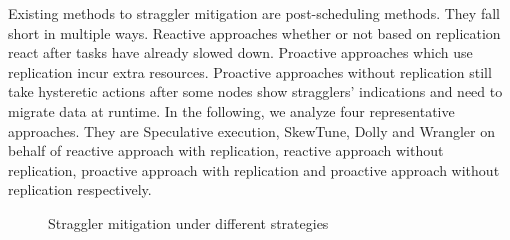 \documentclass[10pt,conference,compsocconf,letterpaper]{IEEEtran}
\begin{document}
  Existing methods to straggler mitigation are post-scheduling methods. They fall short in multiple ways. Reactive approaches whether or not based on replication react after tasks have already slowed down. Proactive approaches which use replication incur extra resources. Proactive approaches without replication still take hysteretic actions after some nodes show stragglers' indications and need to migrate data at runtime. In the following, we analyze four representative approaches. They are Speculative execution, SkewTune, Dolly and Wrangler on behalf of reactive approach with replication, reactive approach without replication, proactive approach with replication and proactive approach without replication respectively.
  \begin{figure}[htbp]
    \centering
    \hfill
    \hfill
    \caption{Straggler mitigation under different strategies}
    \label{Fig. 3:}
  \end{figure}
\end{document}
